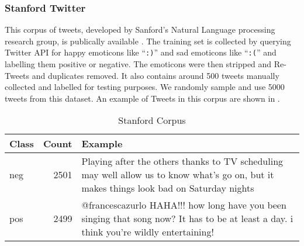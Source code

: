 \subsubsection{Stanford Twitter} This corpus of tweets, developed by Sanford’s
Natural Language processing research group, is publically available \cite{GBH}.
The training set is collected by querying Twitter API for happy emoticons like
``\texttt{:)}'' and sad emoticons like ``\texttt{:(}'' and labelling them
positive or negative. The emoticons were then stripped and Re-Tweets and
duplicates removed. It also contains around 500 tweets manually collected and
labelled for testing purposes. We randomly sample and use 5000 tweets from this
dataset. An example of Tweets in this corpus are shown in .

\begin{table}[h!]
\centering

\begin{tabular}{|l|r|p{}|}
\hline
Class & Count & Example \\\hline
neg & 2501 & Playing after the others thanks to TV scheduling may well allow us to know what's go on, but it makes things look bad on Saturday nights  \\\hline
pos & 2499 & @francescazurlo HAHA!!! how long have you been singing that song now? It has to be at least a day. i think you're wildly entertaining!  \\\hline

\end{tabular}

\caption{Stanford Corpus}
\label{tab:STAN}
\end{table}
